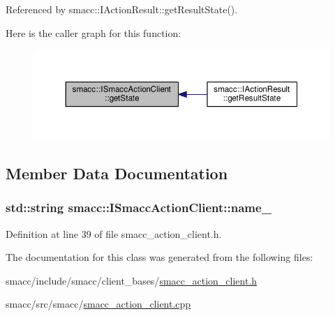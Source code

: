 Referenced by smacc\+::\+I\+Action\+Result\+::get\+Result\+State().



Here is the caller graph for this function\+:
\nopagebreak
\begin{figure}[H]
\begin{center}
\leavevmode
\includegraphics[width=350pt]{classsmacc_1_1ISmaccActionClient_a272349b93828674d57fb48070f4edebf_icgraph}
\end{center}
\end{figure}




\subsection{Member Data Documentation}
\subsubsection[{\texorpdfstring{name\+\_\+}{name_}}]{\setlength{\rightskip}{0pt plus 5cm}std\+::string smacc\+::\+I\+Smacc\+Action\+Client\+::name\+\_\+\hspace{0.3cm}{\ttfamily [protected]}}\hypertarget{classsmacc_1_1ISmaccActionClient_aec84a0169bf40d394207540ad75b364e}{}\label{classsmacc_1_1ISmaccActionClient_aec84a0169bf40d394207540ad75b364e}


Definition at line 39 of file smacc\+\_\+action\+\_\+client.\+h.



The documentation for this class was generated from the following files\+:\begin{DoxyCompactItemize}
\item 
smacc/include/smacc/client\+\_\+bases/\hyperlink{smacc__action__client_8h}{smacc\+\_\+action\+\_\+client.\+h}\item 
smacc/src/smacc/\hyperlink{src_2smacc_2smacc__action__client_8cpp}{smacc\+\_\+action\+\_\+client.\+cpp}\end{DoxyCompactItemize}
